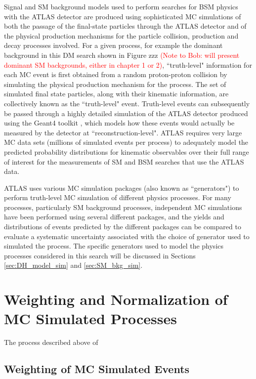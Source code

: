 Signal and SM background models used to perform searches for BSM physics with the ATLAS detector are produced using sophisticated MC simulations of both the passage of the final-state particles through the ATLAS detector and of the physical production mechanisms for the particle collision, production and decay processes involved. For a given process, for example the dominant \wjets background in this DM search shown in Figure zzz \textcolor{red}{(Note to Bob: will present dominant SM backgrounds, either in chapter 1 or 2)}, ``truth-level" information for each MC event is first obtained from a random proton-proton collision by simulating the physical production mechanism for the process. The set of simulated final state particles, along with their kinematic information, are collectively known as the ``truth-level" event. Truth-level events can subsequently be passed through a highly detailed  simulation of the ATLAS detector \cite{atlas_sim} produced using the Geant4 toolkit \cite{Geant4}, which models how these events would actually be measured by the detector at ``reconstruction-level". ATLAS requires very large MC data sets (millions of simulated events per process) to adequately model the predicted probability distributions for kinematic observables over their full range of interest for the measurements of SM and BSM searches that use the ATLAS data.

ATLAS uses various MC simulation packages (also known as ``generators") to perform truth-level MC simulation of different physics processes. For many processes, particularly SM background processes, independent MC simulations have been performed using several different packages, and the yields and distributions of events predicted by the different packages can be compared to evaluate a systematic uncertainty associated with the choice of generator used to simulated the process. The specific generators used to model the physics processes considered in this search will be discussed in Sections \ref{sec:DH_model_sim} and \ref{sec:SM_bkg_sim}.

\section{Weighting and Normalization of MC Simulated Processes}

The process described above of 

\subsection{Weighting of MC Simulated Events}


